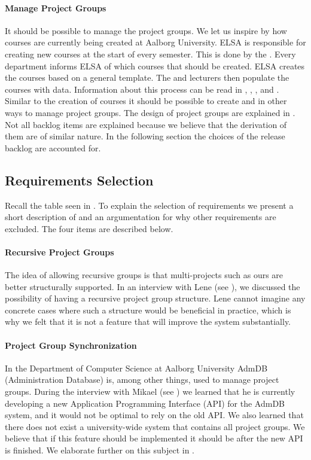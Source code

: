 \paragraph{Manage Project Groups}
It should be possible to manage the project groups. 
We let us inspire by how courses are currently being created at Aalborg University.
ELSA is responsible for creating new courses at the start of every semester. 
This is done by the \admpers{}.
Every department informs ELSA of which courses that should be created. 
ELSA creates the courses based on a general template.
The \admpers{} and lecturers then populate the courses with data. 
Information about this process can be read in , ,  , and .
Similar to the creation of courses it should be possible to create and in other ways to manage project groups. 
The design of project groups are explained in . \\

Not all backlog items are explained because we believe that the derivation of them are of similar nature.
In the following section the choices of the release backlog are accounted for.

\subsection{Requirements Selection}
\label{sec:releaseBacklog}
Recall the table seen in . 
To explain the selection of requirements we present a short description of and an argumentation for why other requirements are excluded.
The four items are described below.

\paragraph{Recursive Project Groups}
The idea of allowing recursive groups is that multi-projects such as ours are better structurally supported.
In an interview with Lene (see ), we discussed the possibility of having a recursive project group structure.
Lene cannot imagine any concrete cases where such a structure would be beneficial in practice, which is why we felt that it is not a feature that will improve the system substantially. 

\paragraph{Project Group Synchronization}
In the Department of Computer Science at Aalborg University AdmDB (Administration Database) is, among other things, used to manage project groups. 
During the interview with Mikael (see ) we learned that he is currently developing a new Application Programming Interface (API) for the AdmDB system, and it would not be optimal to rely on the old API.
We also learned that there does not exist a university-wide system that contains all project groups. 
We believe that if this feature should be implemented it should be after the new API is finished.
We elaborate further on this subject in . 

